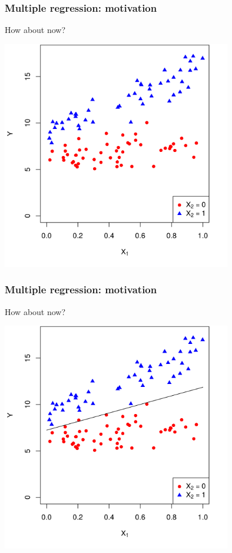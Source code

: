 \documentclass[12pt, 
hyperref={colorlinks=true, linkcolor=blue, urlcolor=cyan},dvipsnames]{beamer}
\begin{document}
\begin{frame}
\frametitle{Multiple regression: motivation}
How about now?

\centering
\includegraphics[width=0.75\textwidth]{plots/effect_modification_colored.png}

\end{frame}

\begin{frame}
\frametitle{Multiple regression: motivation}
How about now?

\centering
\includegraphics[width=0.75\textwidth]{plots/effect_modification_colored_with_simple_line.png}

\end{frame}
\end{document}
